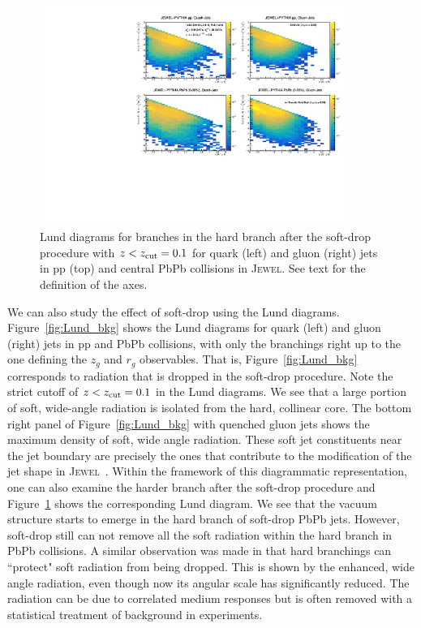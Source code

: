 \documentclass[notoc]{JHEP3}
\newcommand{\jw}{\textsc{Jewel}~}
\begin{document}
\begin{figure}[t]
	   \centering
	   \includegraphics[width=0.9\textwidth]{plots/Individual_LundDiagrams_zrel_hardBranch.pdf}
	   \caption{Lund diagrams for branches in the hard branch after the soft-drop procedure with $z<z_{\rm cut}=0.1$ for quark (left) and gluon (right) jets in pp (top) and central PbPb collisions in \textsc{Jewel}. See text for the definition of the axes.}
\label{fig:Lund_hard}
\end{figure}

We can also study the effect of soft-drop using the Lund diagrams. Figure~\ref{fig:Lund_bkg} shows the Lund diagrams for quark (left) and gluon (right) jets in pp and PbPb collisions, with only the branchings right up to the one defining the $z_g$ and $r_g$ observables. That is, Figure~\ref{fig:Lund_bkg} corresponds to radiation that is dropped in the soft-drop procedure. Note the strict cutoff of $z < z_{\rm cut} = 0.1$ in the Lund diagrams. We see that a large portion of soft, wide-angle radiation is isolated from the hard, collinear core. The bottom right panel of Figure~\ref{fig:Lund_bkg} with quenched gluon jets shows the maximum density of soft, wide angle radiation. These soft jet constituents near the jet boundary are precisely the ones that contribute to the modification of the jet shape in \jw \cite{KunnawalkamElayavalli:2017hxo}. Within the framework of this diagrammatic representation, one can also examine the harder branch after the soft-drop procedure and Figure~\ref{fig:Lund_hard} shows the corresponding Lund diagram. We see that the vacuum structure starts to emerge in the hard branch of soft-drop PbPb jets. However, soft-drop still can not remove all the soft radiation within the hard branch in PbPb collisions. A similar observation was made in \cite{Hoang:2017kmk} that hard branchings can ``protect" soft radiation from being dropped. This is shown by the enhanced, wide angle radiation, even though now its angular scale has significantly reduced. The radiation can be due to correlated medium responses but is often removed with a statistical treatment of background in experiments.
\end{document}
